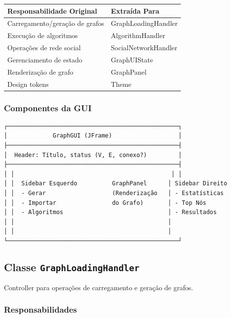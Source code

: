 \documentclass[12pt,a4paper]{article}
\begin{document}
\begin{table}[h]
\centering
\begin{tabular}{|l|l|}
\hline
\textbf{Responsabilidade Original} & \textbf{Extraída Para} \\
\hline
Carregamento/geração de grafos & GraphLoadingHandler \\
\hline
Execução de algoritmos & AlgorithmHandler \\
\hline
Operações de rede social & SocialNetworkHandler \\
\hline
Gerenciamento de estado & GraphUIState \\
\hline
Renderização de grafo & GraphPanel \\
\hline
Design tokens & Theme \\
\hline
\end{tabular}
\end{table}

\subsubsection{Componentes da GUI}

\begin{verbatim}
┌─────────────────────────────────────────────────┐
│             GraphGUI (JFrame)                   │
├─────────────────────────────────────────────────┤
│  Header: Título, status (V, E, conexo?)         │
├─────────────────────────────────────────────────┤
│ │                                             │ │
│ │  Sidebar Esquerdo          GraphPanel      │ Sidebar Direito
│ │  - Gerar                   (Renderização   │ - Estatísticas
│ │  - Importar                do Grafo)       │ - Top Nós
│ │  - Algoritmos                              │ - Resultados
│ │                                            │
│ │                                            │
└─────────────────────────────────────────────────┘
\end{verbatim}

\subsection{Classe \texttt{GraphLoadingHandler}}

Controller para operações de carregamento e geração de grafos.

\subsubsection{Responsabilidades}
\end{document}
